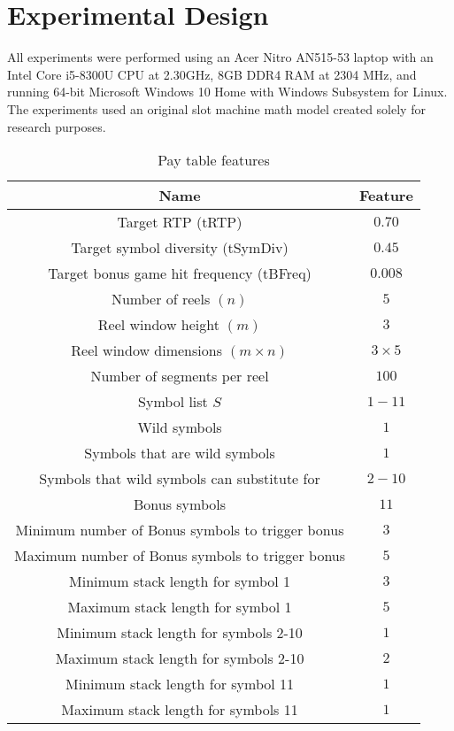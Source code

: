 \documentclass[conference]{IEEEtran}
\begin{document}
\section{Experimental Design}
\label{design}
All experiments were performed using an Acer Nitro AN515-53 laptop with an Intel Core i5-8300U CPU at 2.30GHz, 8GB DDR4 RAM at 2304 MHz, and running 64-bit Microsoft Windows 10 Home with Windows Subsystem for Linux.
The experiments used an original slot machine math model created solely for research purposes.
\begin{table}[htbp]
\caption{Pay table features}
\begin{center}
\begin{tabular}{|c|c|}
\hline
\textbf{Name}&\textbf{Feature} \\
\hline
Target RTP (tRTP) & $0.70$ \\
\hline
Target symbol diversity (tSymDiv) & $0.45$ \\
\hline
Target bonus game hit frequency (tBFreq) & $0.008$ \\
\hline
Number of reels $(n)$ & $5$ \\
\hline
Reel window height $(m)$ & $3$ \\
\hline
Reel window dimensions $(m\times n)$ & $3\times 5$ \\
\hline
Number of segments per reel & $100$ \\
\hline
Symbol list $S$ & $1-11$ \\
\hline
Wild symbols & $1$  \\
\hline
Symbols that are wild symbols & $1$ \\
\hline
Symbols that wild symbols can substitute for & $2-10$\\
\hline
Bonus symbols & $11$  \\
\hline
Minimum number of Bonus symbols to trigger bonus & $3$ \\
\hline
Maximum number of Bonus symbols to trigger bonus & $5$ \\
\hline
Minimum stack length for symbol 1 & $3$  \\
\hline
Maximum stack length for symbol 1 & $5$  \\
\hline
Minimum stack length for symbols 2-10 & $1$  \\
\hline
Maximum stack length for symbols 2-10 & $2$  \\
\hline
Minimum stack length for symbol 11 & $1$  \\
\hline
Maximum stack length for symbols 11 & $1$  \\
\hline
\end{tabular}
\label{paytableFeatures}
\end{center}
\end{table}
\end{document}
